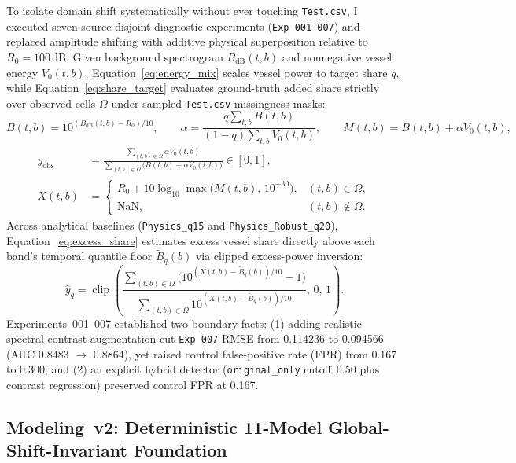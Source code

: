 \documentclass[10pt,a4paper]{article}
\begin{document}
To isolate domain shift systematically without ever touching \texttt{Test.csv}, I executed seven source-disjoint diagnostic experiments (\texttt{Exp~001--007}) and replaced amplitude shifting with additive physical superposition relative to $R_0 = 100$\,dB. Given background spectrogram $B_{\mathrm{dB}}(t,b)$ and nonnegative vessel energy $V_0(t,b)$, Equation~\eqref{eq:energy_mix} scales vessel power to target share $q$, while Equation~\eqref{eq:share_target} evaluates ground-truth added share strictly over observed cells $\Omega$ under sampled \texttt{Test.csv} missingness masks:
\begin{equation}
\label{eq:energy_mix}
B(t,b) = 10^{(B_{\mathrm{dB}}(t,b) - R_0)/10}, \qquad
\alpha = \frac{q \sum_{t,b} B(t,b)}{(1 - q)\sum_{t,b} V_0(t,b)}, \qquad
M(t,b) = B(t,b) + \alpha V_0(t,b),
\end{equation}
\begin{align}
\label{eq:share_target}
y_{\mathrm{obs}} &= \frac{\sum_{(t,b)\in\Omega} \alpha V_0(t,b)}{\sum_{(t,b)\in\Omega} \big(B(t,b) + \alpha V_0(t,b)\big)} \in [0,1], \nonumber\\
X(t,b) &= \begin{cases}
R_0 + 10\log_{10}\!\max\!\big(M(t,b),\, 10^{-30}\big), & (t,b) \in \Omega, \\
\mathrm{NaN}, & (t,b) \notin \Omega.
\end{cases}
\end{align}
Across analytical baselines (\texttt{Physics\_q15} and \texttt{Physics\_Robust\_q20}), Equation~\eqref{eq:excess_share} estimates excess vessel share directly above each band's temporal quantile floor $\tilde{B}_q(b)$ via clipped excess-power inversion:
\begin{equation}
\label{eq:excess_share}
\hat{y}_q = \operatorname{clip}\!\left(\frac{\sum_{(t,b)\in\Omega} \big(10^{(X(t,b) - \tilde{B}_q(b))/10} - 1\big)}{\sum_{(t,b)\in\Omega} 10^{(X(t,b) - \tilde{B}_q(b))/10}},\, 0,\, 1\right).
\end{equation}
Experiments~001--007 established two boundary facts: (1) adding realistic spectral contrast augmentation cut \texttt{Exp~007} RMSE from 0.114236 to 0.094566 (AUC 0.8483 $\to$ 0.8864), yet raised control false-positive rate (FPR) from 0.167 to 0.300; and (2) an explicit hybrid detector (\texttt{original\_only} cutoff~0.50 plus contrast regression) preserved control FPR at 0.167.

\subsection{Modeling~v2: Deterministic 11-Model Global-Shift-Invariant Foundation}
\end{document}

